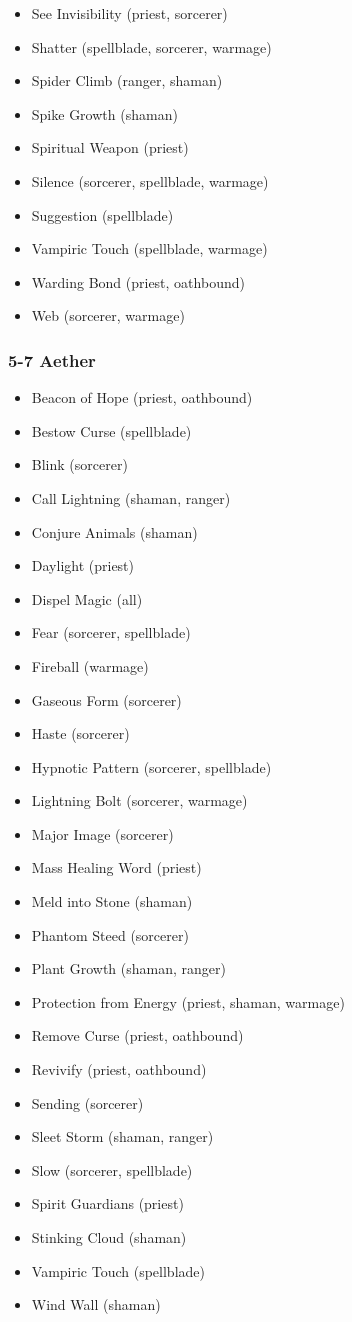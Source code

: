 \begin{itemize}
\item See Invisibility (priest, sorcerer)
\item Shatter (spellblade, sorcerer, warmage)
\item Spider Climb (ranger, shaman)
\item Spike Growth (shaman)
\item Spiritual Weapon (priest)
\item Silence (sorcerer, spellblade, warmage)
\item Suggestion (spellblade)
\item Vampiric Touch (spellblade, warmage)
\item Warding Bond (priest, oathbound)
\item Web (sorcerer, warmage)
\end{itemize}

\subsubsection{5-7 Aether}
\begin{itemize}
\item Beacon of Hope (priest, oathbound)
\item Bestow Curse (spellblade)
\item Blink (sorcerer)
\item Call Lightning (shaman, ranger)
\item Conjure Animals (shaman)
\item Daylight (priest)
\item Dispel Magic (all)
\item Fear (sorcerer, spellblade)
\item Fireball (warmage)
\item Gaseous Form (sorcerer)
\item Haste (sorcerer)
\item Hypnotic Pattern (sorcerer, spellblade)
\item Lightning Bolt (sorcerer, warmage)
\item Major Image (sorcerer)
\item Mass Healing Word (priest)
\item Meld into Stone (shaman)
\item Phantom Steed (sorcerer)
\item Plant Growth (shaman, ranger)
\item Protection from Energy (priest, shaman, warmage)
\item Remove Curse (priest, oathbound)
\item Revivify (priest, oathbound)
\item Sending (sorcerer)
\item Sleet Storm (shaman, ranger)
\item Slow (sorcerer, spellblade)
\item Spirit Guardians (priest)
\item Stinking Cloud (shaman)
\item Vampiric Touch (spellblade)
\item Wind Wall (shaman)
\end{itemize}

